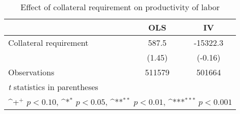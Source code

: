 \begin{table}[htbp]\centering
\def\sym#1{\ifmmode^{#1}\else\(^{#1}\)\fi}
\caption{Effect of collateral requirement on productivity of labor}
\begin{tabular}{l*{2}{c}}
\toprule
                    &\multicolumn{1}{c}{OLS}&\multicolumn{1}{c}{IV}\\
\midrule
Collateral requirement&       587.5         &    -15322.3         \\
                    &      (1.45)         &     (-0.16)         \\
\midrule
Observations        &      511579         &      501664         \\
\bottomrule
\multicolumn{3}{l}{\footnotesize \textit{t} statistics in parentheses}\\
\multicolumn{3}{l}{\footnotesize \sym{+} \(p<0.10\), \sym{*} \(p<0.05\), \sym{**} \(p<0.01\), \sym{***} \(p<0.001\)}\\
\end{tabular}
\end{table}
